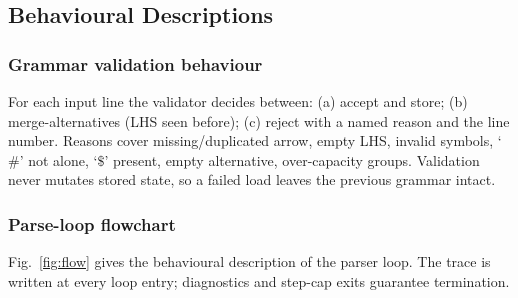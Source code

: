 \documentclass[12pt,a4paper,oneside,openany]{report}
\begin{document}
\subsection{Behavioural Descriptions}
\subsubsection*{Grammar validation behaviour}
For each input line the validator decides between: (a) accept and store;
(b) merge-alternatives (LHS seen before); (c) reject with a named reason
and the line number. Reasons cover missing/duplicated arrow, empty LHS,
invalid symbols, `$\#$' not alone, `$\$$' present, empty alternative,
over-capacity groups. Validation never mutates stored state, so a failed
load leaves the previous grammar intact.

\subsubsection*{Parse-loop flowchart}
Fig.~\ref{fig:flow} gives the behavioural description of the parser loop.
The trace is written at every loop entry; diagnostics and step-cap exits
guarantee termination.
\end{document}
